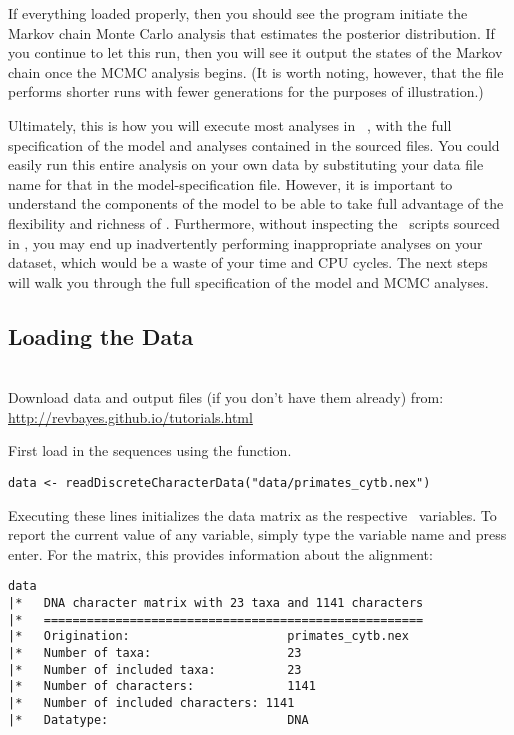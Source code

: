 If everything loaded properly, then you should see the program initiate the Markov chain Monte Carlo analysis that estimates the posterior distribution. 
If you continue to let this run, then you will see it output the states of the Markov chain once the MCMC analysis begins. 
(It is worth noting, however, that the file  performs shorter runs with fewer generations for the purposes of illustration.)

Ultimately, this is how you will execute most analyses in \RevBayes~, with the full specification of the model and analyses contained in the sourced files. 
You could easily run this entire analysis on your own data by substituting your data file name for that in the model-specification file. 
However, it is important to understand the components of the model to be able to take full advantage of the flexibility and richness of \RevBayes.
Furthermore, without inspecting the \Rev~scripts sourced in , you may end up inadvertently performing inappropriate analyses on your dataset, which would be a waste of your time and CPU cycles. 
The next steps will walk you through the full specification of the model and MCMC analyses. 

\bigskip

\subsection{Loading the Data}

\noindent \\ \impmark Download data and output files (if you don't have them already) from: \href{http://revbayes.github.io/tutorials.html}{http://revbayes.github.io/tutorials.html}


First load in the sequences using the  function. 
{\tt \begin{snugshade*}
\begin{lstlisting}
data <- readDiscreteCharacterData("data/primates_cytb.nex")
\end{lstlisting}
\end{snugshade*}}
Executing these lines initializes the data matrix as the respective \Rev~variables. 
To report the current value of any variable, simply type the variable name and press enter. For the  matrix, this provides information about the alignment:
{\tt \begin{snugshade*}
\begin{lstlisting}
data
|*   DNA character matrix with 23 taxa and 1141 characters
|*   =====================================================
|*   Origination:                      primates_cytb.nex
|*   Number of taxa:                   23
|*   Number of included taxa:          23
|*   Number of characters:             1141
|*   Number of included characters: 1141
|*   Datatype:                         DNA
\end{lstlisting}
\end{snugshade*}}


